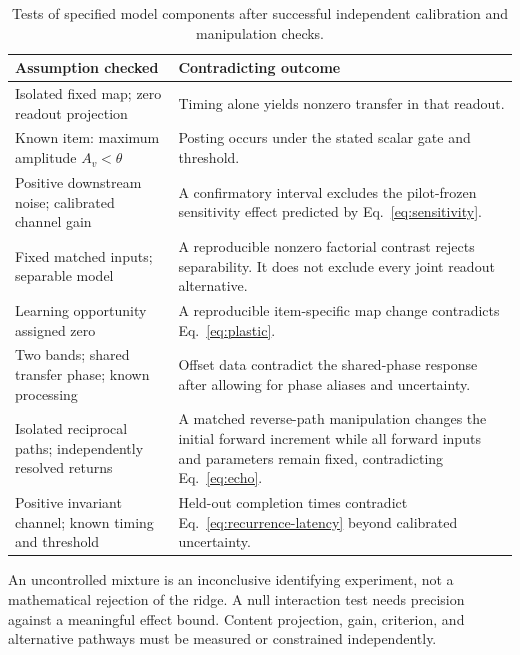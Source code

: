 \documentclass[submission,nolinenumbers]{esj}
\begin{document}
\begin{table}[htbp]\centering
\caption{Tests of specified model components after successful independent calibration and manipulation checks.}\label{tab:reject}
\begingroup\setlength{\tabcolsep}{5pt}\renewcommand{\arraystretch}{1.2}
\begin{tabularx}{\linewidth}{@{}>{\RaggedRight\arraybackslash}p{.33\linewidth}Y@{}}\toprule
Assumption checked & Contradicting outcome\\\midrule
Isolated fixed map; zero readout projection & Timing alone yields nonzero transfer in that readout.\\\addlinespace[5pt]
Known item: maximum amplitude $A_v<\theta$ & Posting occurs under the stated scalar gate and threshold.\\\addlinespace[5pt]
Positive downstream noise; calibrated channel gain & A confirmatory interval excludes the pilot-frozen sensitivity effect predicted by Eq.~\eqref{eq:sensitivity}.\\\addlinespace[5pt]
Fixed matched inputs; separable model & A reproducible nonzero factorial contrast rejects separability. It does not exclude every joint readout alternative.\\\addlinespace[5pt]
Learning opportunity assigned zero & A reproducible item-specific map change contradicts Eq.~\eqref{eq:plastic}.\\\addlinespace[5pt]
Two bands; shared transfer phase; known processing & Offset data contradict the shared-phase response after allowing for phase aliases and uncertainty.\\\addlinespace[5pt]
Isolated reciprocal paths; independently resolved returns & A matched reverse-path manipulation changes the initial forward increment while all forward inputs and parameters remain fixed, contradicting Eq.~\eqref{eq:echo}.\\\addlinespace[5pt]
Positive invariant channel; known timing and threshold & Held-out completion times contradict Eq.~\eqref{eq:recurrence-latency} beyond calibrated uncertainty.\\\bottomrule
\end{tabularx}\endgroup\end{table}
An uncontrolled mixture is an inconclusive identifying experiment, not a mathematical rejection of the ridge. A null interaction test needs precision against a meaningful effect bound. Content projection, gain, criterion, and alternative pathways must be measured or constrained independently.
\end{document}
